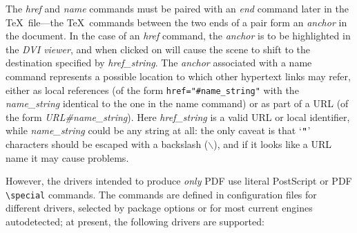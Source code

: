 \documentclass{article}
\begin{document}
The \emph{href} and \emph{name} commands must be paired with an
\emph{end} command later in the \TeX\ file---the \TeX\ commands between
the two ends of a pair form an \emph{anchor} in the document. In the
case of an \emph{href} command, the \emph{anchor} is to be highlighted
in the \emph{DVI viewer}, and when clicked on will cause the scene to
shift to the destination specified by \emph{href\_string}. The
\emph{anchor} associated with a name command represents a possible
location to which other hypertext links may refer, either as local
references (of the form \verb|href="#name_string"| with the
\emph{name\_string} identical to the one in the name command) or as part
of a URL (of the form \emph{URL\#name\_string}). Here
\emph{href\_string} is a valid URL or local identifier, while
\emph{name\_string} could be any string at all: the only caveat is that
`$\verb|"|$' characters should be escaped with a backslash
($\backslash$), and if it looks like a URL name it may cause problems.

However, the drivers intended to produce \emph{only} PDF use literal
PostScript or PDF \verb|\special| commands. The commands are defined in
configuration files for different drivers, selected by package options or for
most current engines autodetected;
at present, the following drivers are supported:
\end{document}
